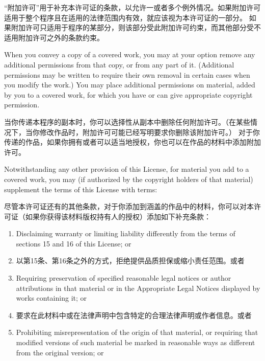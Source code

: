 \documentclass[11pt]{article}
\begin{document}
\begin{enumerate}
        “附加许可”用于补充本许可证的条款，以允许一或者多个例外情况。如果附加许可适用于整个程序且在适用的法律范围内有效，就应该视为本许可证的一部分。
        如果附加许可只适用于程序的某部分，则该部分受此附加许可约束，而其他部分受不适用附加许可之外的条款约束。

        When you convey a copy of a covered work, you may at your option
        remove any additional permissions from that copy, or from any part of
        it.  (Additional permissions may be written to require their own
        removal in certain cases when you modify the work.)  You may place
        additional permissions on material, added by you to a covered work,
        for which you have or can give appropriate copyright permission.

        当你传递本程序的副本时，你可以选择性从副本中删除任何附加许可。（在某些情况下，当你修改作品时，附加许可可能已经写明要求你删除该附加许可。）
        对于你传递的作品，如果你拥有或者可以适当地授权，你也可以在作品的材料中添加附加许可。

        Notwithstanding any other provision of this License, for material you
        add to a covered work, you may (if authorized by the copyright holders of
        that material) supplement the terms of this License with terms:

        尽管本许可证还有的其他条款，对于你添加到涵盖的作品中的材料，你可以对本许可证（如果你获得该材料版权持有人的授权）添加如下补充条款：

        \begin{enumerate}
          \item Disclaiming warranty or limiting liability differently from the
                terms of sections 15 and 16 of this License; or

          \item 以第15条、第16条之外的方式，拒绝提供品质担保或缩小责任范围。或者

          \item Requiring preservation of specified reasonable legal notices or
                author attributions in that material or in the Appropriate Legal
                Notices displayed by works containing it; or

          \item 要求在此材料中或在法律声明中包含特定的合理法律声明或作者信息。或者

          \item Prohibiting misrepresentation of the origin of that material, or
                requiring that modified versions of such material be marked in
                reasonable ways as different from the original version; or


\end{enumerate}
\end{enumerate}
\end{document}
